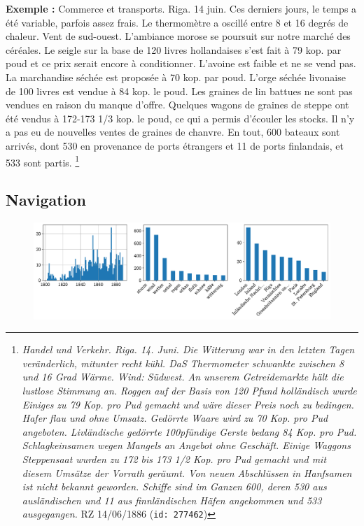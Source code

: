 \documentclass[a4paper,twoside,12pt]{article}
\begin{document}
\noindent \textbf{Exemple :} \og Commerce et transports. Riga. 14 juin. Ces derniers jours, le temps a été variable, parfois assez frais. Le thermomètre a oscillé entre 8 et 16 degrés de chaleur. Vent de sud-ouest. L'ambiance morose se poursuit sur notre marché des céréales. Le seigle sur la base de 120 livres hollandaises s'est fait à 79 kop. par poud et ce prix serait encore à conditionner. L'avoine est faible et ne se vend pas. La marchandise séchée est proposée à 70 kop. par poud. L'orge séchée livonaise de 100 livres est vendue à 84 kop. le poud. Les graines de lin battues ne sont pas vendues en raison du manque d'offre. Quelques wagons de graines de steppe ont été vendus à 172-173 1/3 kop. le poud, ce qui a permis d'écouler les stocks. Il n'y a pas eu de nouvelles ventes de graines de chanvre. En tout, 600 bateaux sont arrivés, dont 530 en provenance de ports étrangers et 11 de ports finlandais, et 533 sont partis. \fg{}\footnote{\textit{Handel und Verkehr. Riga. 14. Juni. Die Witterung war in den letzten Tagen veränderlich, mitunter recht kühl. DaS Thermometer schwankte zwischen 8 und 16 Grad Wärme. Wind: Südwest. An unserem Getreidemarkte hält die lustlose Stimmung an. Roggen auf der Basis von 120 Pfund holländisch wurde Einiges zu 79 Kop. pro Pud gemacht und wäre dieser Preis noch zu bedingen. Hafer flau und ohne Umsatz. Gedörrte Waare wird zu 70 Kop. pro Pud angeboten. Livländische gedörrte 100pfündige Gerste bedang 84 Kop. pro Pud. Schlagkeinsamen wegen Mangels an Angebot ohne Geschäft. Einige Waggons Steppensaat wurden zu 172 bis 173 1/2 Kop. pro Pud gemacht und mit diesem Umsätze der Vorrath geräumt. Von neuen Abschlüssen in Hanfsamen ist nicht bekannt geworden. Schiffe sind im Ganzen 600, deren 530 aus ausländischen und 11 aus finnländischen Häfen angekommen und 533 ausgegangen.} RZ 14/06/1886 (\texttt{id: 277462})}



\subsection*{Navigation} \label{topic6_navigation}

\begin{figure}[H]
\centering
\includegraphics[width=\textwidth]{images/topic_charts_6.pdf}
\end{figure}
\end{document}
